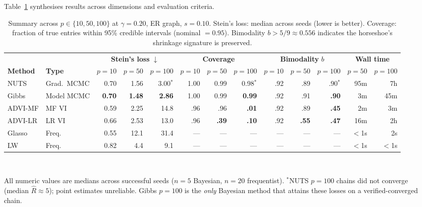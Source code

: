 \documentclass[10pt,conference,compsoc]{IEEEtran}
\begin{document}
Table~\ref{tab:summary} synthesises results across dimensions and evaluation criteria.

\begin{table}[t]
\centering
\caption{Summary across $p \in \{10, 50, 100\}$ at $\gamma = 0.20$, ER graph, $s = 0.10$. Stein's loss: median across seeds (lower is better). Coverage: fraction of true entries within 95\% credible intervals (nominal $= 0.95$). Bimodality $b > 5/9 \approx 0.556$ indicates the horseshoe's shrinkage signature is preserved.}
\label{tab:summary}
\small
\begin{tabular}{@{}ll rrr rrr rrr rr@{}}
\toprule
& & \multicolumn{3}{c}{\textbf{Stein's loss} $\downarrow$} & \multicolumn{3}{c}{\textbf{Coverage}} & \multicolumn{3}{c}{\textbf{Bimodality} $b$} & \multicolumn{2}{c}{\textbf{Wall time}} \\
\cmidrule(lr){3-5} \cmidrule(lr){6-8} \cmidrule(lr){9-11} \cmidrule(lr){12-13}
\textbf{Method} & \textbf{Type} & \footnotesize $p{=}10$ & \footnotesize $p{=}50$ & \footnotesize $p{=}100$ & \footnotesize $p{=}10$ & \footnotesize $p{=}50$ & \footnotesize $p{=}100$ & \footnotesize $p{=}10$ & \footnotesize $p{=}50$ & \footnotesize $p{=}100$ & \footnotesize $p{=}50$ & \footnotesize $p{=}100$ \\
\midrule
NUTS      & Grad.\ MCMC & 0.70 & 1.56 & 3.00$^*$ & 1.00 & 0.99 & 0.98$^*$ & .92 & .89 & .90$^*$ & 95m  & 7h \\
Gibbs     & Model MCMC  & \textbf{0.70} & \textbf{1.48} & \textbf{2.86} & 1.00 & 0.99 & \textbf{0.99} & .92 & .91 & \textbf{.90} & 3m   & 45m \\
ADVI-MF   & MF VI       & 0.59  & 2.25  & 14.8   & .96 & .96 & \textbf{.01} & .92 & .89 & \textbf{.45} & 2m   & 3m \\
ADVI-LR   & LR VI       & 0.66  & 2.53  & 13.0   & .96 & \textbf{.39} & \textbf{.10} & .92 & \textbf{.55} & \textbf{.47} & 16m  & 2h \\
Glasso    & Freq.       & 0.55 & 12.1 & 31.4   & --- & --- & --- & --- & --- & --- & $<$1s & 2s \\
LW        & Freq.       & 0.82 & 4.4  & 9.1    & --- & --- & --- & --- & --- & --- & $<$1s & $<$1s \\
\bottomrule
\end{tabular}\\[2pt]
\raggedright\footnotesize All numeric values are medians across successful seeds ($n{=}5$ Bayesian, $n{=}20$ frequentist). $^*$NUTS $p{=}100$ chains did not converge (median $\hat{R}\approx 5$); point estimates unreliable. Gibbs $p{=}100$ is the \emph{only} Bayesian method that attains these losses on a verified-converged chain.
\end{table}
\end{document}

